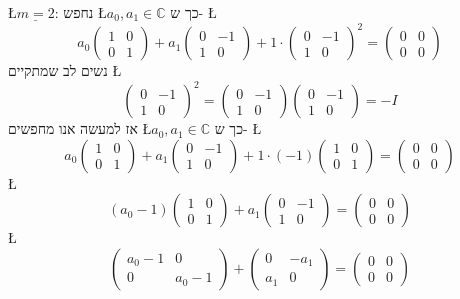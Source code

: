 \documentclass[english,hebrew]{article}
\begin{document}
\L{$\underline{m=2}$}: נחפש \L{$a_{0},a_{1}\in\mathbb{C}$} כך ש-
\L{%
\[
a_{0}\begin{pmatrix}1 & 0\\
0 & 1
\end{pmatrix}+a_{1}\begin{pmatrix}0 & -1\\
1 & 0
\end{pmatrix}+1\cdot\begin{pmatrix}0 & -1\\
1 & 0
\end{pmatrix}^{2}=\begin{pmatrix}0 & 0\\
0 & 0
\end{pmatrix}
\]
}%
נשים לב שמתקיים \L{%
\[
\begin{pmatrix}0 & -1\\
1 & 0
\end{pmatrix}^{2}=\begin{pmatrix}0 & -1\\
1 & 0
\end{pmatrix}\begin{pmatrix}0 & -1\\
1 & 0
\end{pmatrix}=-I
\]
}%
אז למעשה אנו מחפשים \L{$a_{0},a_{1}\in\mathbb{C}$} כך ש- \L{%
\[
a_{0}\begin{pmatrix}1 & 0\\
0 & 1
\end{pmatrix}+a_{1}\begin{pmatrix}0 & -1\\
1 & 0
\end{pmatrix}+1\cdot\left(-1\right)\begin{pmatrix}1 & 0\\
0 & 1
\end{pmatrix}=\begin{pmatrix}0 & 0\\
0 & 0
\end{pmatrix}
\]
}%
\L{%
\[
\left(a_{0}-1\right)\begin{pmatrix}1 & 0\\
0 & 1
\end{pmatrix}+a_{1}\begin{pmatrix}0 & -1\\
1 & 0
\end{pmatrix}=\begin{pmatrix}0 & 0\\
0 & 0
\end{pmatrix}
\]
}%
\L{%
\[
\begin{pmatrix}a_{0}-1 & 0\\
0 & a_{0}-1
\end{pmatrix}+\begin{pmatrix}0 & -a_{1}\\
a_{1} & 0
\end{pmatrix}=\begin{pmatrix}0 & 0\\
0 & 0
\end{pmatrix}
\]
}%
\end{document}
